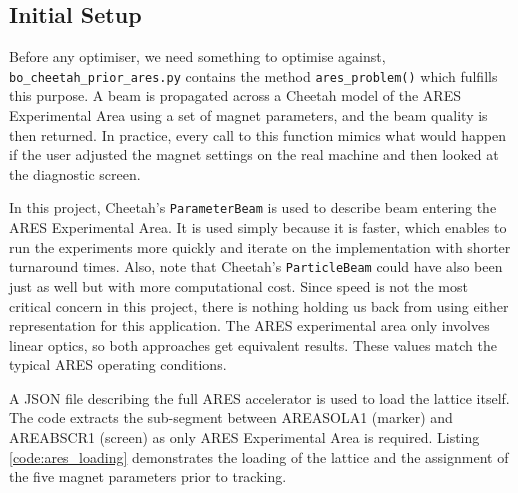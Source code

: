 \subsection{Initial Setup}
Before any optimiser, we need something to optimise against, \texttt{bo\_cheetah\_prior\_ares.py} contains
the method \texttt{ares\_problem()} which fulfills this purpose. A beam is propagated across a Cheetah model of the ARES Experimental 
Area using a set of magnet parameters, and the beam quality is then returned. In practice, every call to this function 
mimics what would happen if the user adjusted the magnet settings on the real machine and then looked at the diagnostic screen. \

In this project, Cheetah's \texttt{ParameterBeam} is used to describe beam entering the ARES Experimental Area. It is used 
simply because it is faster, which enables to run the experiments more quickly and iterate on the implementation with shorter turnaround times.
 Also, note that Cheetah's \texttt{ParticleBeam} could have also been just as well but with more computational cost. Since speed is not the most critical 
 concern in this project, there is nothing holding us back from using either representation for this application. The ARES experimental area only 
 involves linear optics, so both approaches get equivalent results. These values match the typical ARES operating conditions.

A JSON file describing the full ARES accelerator is used to load the lattice itself. The code extracts the sub-segment between AREASOLA1 (marker) and AREABSCR1 (screen) 
as only ARES Experimental Area is required. Listing \ref{code:ares_loading} demonstrates the loading of the lattice and the assignment of the five magnet parameters prior to tracking.


\lstset{language=Python,
    basicstyle=\ttfamily\small,      %
    keywordstyle=\color{blue},        %
    commentstyle=\color{teal},        %
    stringstyle=\color{purple},       %
    showstringspaces=false,           %
    breaklines=true,                  %
    numbers=left,                      %
    numberstyle=\tiny\color{gray},     %
    frame=single,                       %
    backgroundcolor=\color{lightgray!20}, %
    xleftmargin=2em,                    %
    framexleftmargin=2em                 %
}

